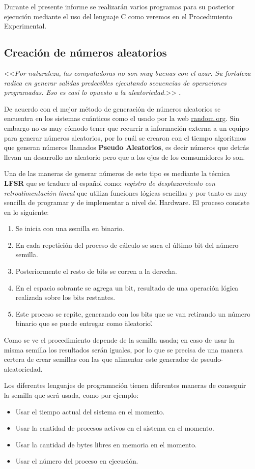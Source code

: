Durante el presente informe se realizarán varios programas para su posterior ejecución mediante el uso del lenguaje C como veremos en el Procedimiento Experimental.

\subsection{Creación de números aleatorios}
<<\textit{Por naturaleza, las computadoras no son muy buenas con el azar. Su fortaleza radica en generar salidas predecibles ejecutando secuencias de operaciones programadas. Eso es casi lo opuesto a la aleatoriedad.}>> \parencite{NumerosAleatorios}.

De acuerdo con \textcite{eduardo2022Azar} el mejor método de generación de números aleatorios se encuentra en los sistemas cuánticos como el usado por la web \href{https://www.random.org/}{random.org}. Sin embargo no es muy cómodo tener que recurrir a información externa a un equipo para generar números aleatorios, por lo cuál se crearon con el tiempo algoritmos que generan números llamados \textbf{Pseudo Aleatorios}, es decir números que detrás llevan un desarrollo no aleatorio pero que a los ojos de los comsumidores lo son.

Una de las maneras de generar números de este tipo es mediante la técnica \textbf{LFSR} que se traduce al español como: \textit{registro de desplazamiento con retroalimentación lineal} que utiliza funciones lógicas sencillas y por tanto es muy sencilla de programar y de implementar a nivel del Hardware. El proceso consiste en lo siguiente:
\begin{enumerate}
  \item Se inicia con una semilla en binario.
  \item En cada repetición del proceso de cálculo se saca el último bit del número semilla.
  \item Posteriormente el resto de bits se corren a la derecha.
  \item En el espacio sobrante se agrega un bit, resultado de una operación lógica realizada sobre los bits restantes.
  \item Este proceso se repite, generando con los bits que se van retirando un número binario que se puede entregar como \"aleatorio\".
\end{enumerate}

Como se ve el procedimiento depende de la semilla usada; en caso de usar la misma semilla los resultados serán iguales, por lo que se precisa de una manera certera de crear semillas con las que alimentar este generador de pseudo-aleatoriedad.

Los diferentes lenguajes de programación tienen diferentes maneras de conseguir la semilla que será usada, como por ejemplo:
\begin{itemize}
  \item Usar el tiempo actual del sistema en el momento.
  \item Usar la cantidad de procesos activos en el sistema en el momento.
  \item Usar la cantidad de bytes libres en memoria en el momento.
  \item Usar el número del proceso en ejecución.
\end{itemize}